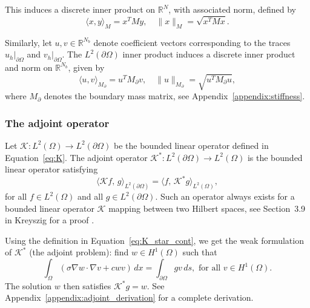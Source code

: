 This induces a discrete inner product on $\mathbb{R}^N$, with associated norm, defined by
\begin{equation}\label{eq:fem_norm}
    \langle x, y \rangle_M = x^T M y,
    \quad
    \| x \|_M = \sqrt{x^T M x}.
\end{equation}

Similarly, let $u, v \in \mathbb{R}^{N_b}$ 
denote coefficient vectors corresponding to the traces 
$u_h|_{\partial\Omega}$ and $v_h|_{\partial\Omega}$. The $L^2(\partial\Omega)$ inner product induces a discrete inner product and norm on $\mathbb{R}^{N_b}$, given by
\begin{equation}\label{eq:fem_norm_ds}
    \langle u, v \rangle_{M_{\partial}}
    = u^T M_{\partial} v,
    \quad
    \| u \|_{M_{\partial}}
    =
    \sqrt{u^T M_{\partial} u},
\end{equation}
where $M_\partial$ denotes the boundary mass matrix, see Appendix~\ref{appendix:stiffness}.
%


\subsubsection{The adjoint operator}
Let $\mathcal{K}: L^2(\Omega) \to L^2(\partial\Omega)$ be the bounded linear operator defined in Equation~\eqref{eq:K}. The adjoint operator $\mathcal{K}^*: L^2(\partial\Omega) \to L^2(\Omega)$ is the bounded linear operator satisfying
\begin{equation}\label{eq:K_star_cont}
    \langle \mathcal K f,\, g \rangle_{L^2(\partial\Omega)} =
    \langle f,\, \mathcal K^* g \rangle_{L^2(\Omega)},
\end{equation}
for all $f \in L^2(\Omega)$ and all $g \in L^2(\partial\Omega)$. Such an operator always exists for a bounded linear operator $\mathcal K$ mapping between two Hilbert spaces, see Section~3.9 in Kreyszig for a proof \cite{kreyszigIntroductoryFunctionalAnalysis1989}.
%

Using the definition in Equation~\eqref{eq:K_star_cont}, we get the weak formulation of $\mathcal{K}^*$ (the adjoint problem): find $w \in H^1(\Omega)$ such that
\begin{equation}\label{eq:variational_formulation_adjoint}
    \int_\Omega (\sigma \nabla w \cdot \nabla v + c w v) \, dx =
    \int_{\partial\Omega} g v \, ds,
    \text{ for all } v \in H^1(\Omega).
\end{equation}
The solution $w$ then satisfies $\mathcal K^* g = w$. See Appendix~\ref{appendix:adjoint_derivation} for a complete derivation.


